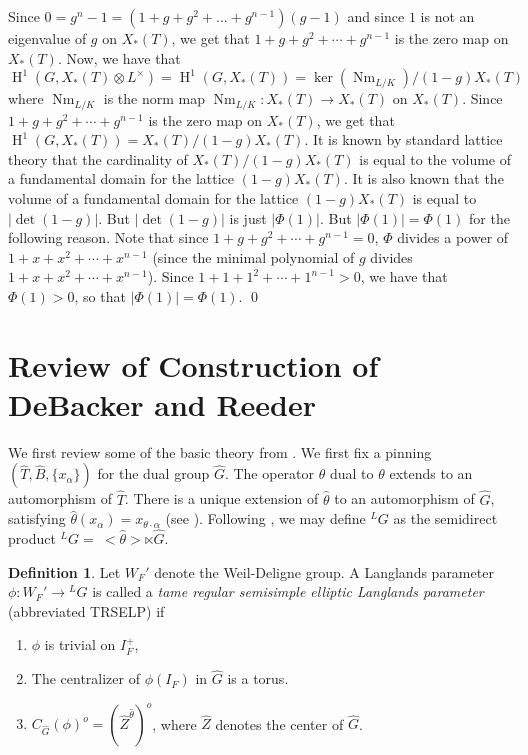 \documentclass[11pt]{amsart}
\theoremstyle{plain}
\theoremstyle{definition}
\newtheorem{definition}[theorem]{Definition}
\DeclareMathOperator{\HH}{H}
\DeclareMathOperator{\Nm}{Nm}
\begin{document}
\proof

Since $0 = g^n - 1 = (1 + g + g^2 + ... + g^{n-1})(g-1)$ and since $1$
is not an eigenvalue of $g$ on $X_*(T)$, we get that $1 + g + g^2 + \cdots + g^{n-1}$
is the zero map on $X_*(T)$.  Now, we have that
$\HH^1(G, X_*(T)\otimes L^{\times}) = \HH^1(G, X_*(T)) = \ker(\Nm_{L/K}) / (1 - g)X_*(T)$
where $\Nm_{L/K}$ is the norm map $\Nm_{L/K} : X_*(T) \rightarrow X_*(T)$ on $X_*(T)$.
Since $1 + g + g^2 + \cdots + g^{n-1}$ is the zero map on $X_*(T)$,
we get that $\HH^1(G, X_*(T)) = X_*(T) / (1 - g)X_*(T)$.  It is known by standard lattice
theory that the cardinality of $X_*(T) / (1 - g)X_*(T)$ is equal to the volume of
a fundamental domain for the lattice $(1 - g)X_*(T)$.  It is also known that
the volume of a fundamental domain for the lattice $(1 - g)X_*(T)$ is equal to
$|\det(1 - g)|$.  But $|\det(1 - g)|$ is just $|\Phi(1)|$.  But
$|\Phi(1)| = \Phi(1)$ for the following reason.  Note that since
$1 + g + g^2 + \cdots + g^{n-1} = 0$, $\Phi$ divides a power of
$1 + x + x^2 + \cdots + x^{n-1}$ (since the minimal polynomial of $g$
divides $1 + x + x^2 + \cdots + x^{n-1}$).  Since
$1 + 1 + 1^2 + \cdots + 1^{n-1} > 0$, we have that $\Phi(1) > 0$,
so that $|\Phi(1)| = \Phi(1)$.
\qed

\section{Review of Construction of DeBacker and Reeder}\label{preliminaries}

We first review some of the basic theory from \cite{debackerreeder}.
We first fix a pinning $(\hat{T}, \hat{B}, \{x_{\alpha} \})$ for the
dual group $\hat{G}$.  The operator $\hat{\theta}$ dual to $\theta$
extends to an automorphism of $\hat{T}$.  There is a unique extension
of $\hat{\theta}$ to an automorphism of $\hat{G}$, satisfying
$\hat{\theta}(x_{\alpha}) = x_{\theta \cdot \alpha}$ (see
\cite[section 3.2]{debackerreeder}).  Following \cite{debackerreeder},
we may define ${}^LG$ as the semidirect product ${}^L G = \ <\hat{\theta}> \ltimes \hat{G}$.

\begin{definition}
  Let $W_F'$ denote the Weil-Deligne group.  A Langlands parameter
  $\phi : W_F' \rightarrow {}^L G$ is called a \emph{tame regular
    semisimple elliptic Langlands parameter} (abbreviated TRSELP) if

  \begin{enumerate}
    \item $\phi$ is trivial on $I_F^+$,

    \item The centralizer of $\phi(I_F)$ in $\hat{G}$ is a torus.

    \item $C_{\hat{G}}(\phi)^o = (\hat{Z}^{\hat{\theta}})^o$, where $\hat{Z}$ denotes the center of $\hat{G}$.
  \end{enumerate}
\end{definition}
\end{document}
